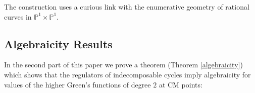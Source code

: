 \documentclass[11pt,a4paper]{article}
\newtheorem{thm}[defn]{Theorem}
\newcommand {\Q}{{\mathds Q}}
\newcommand {\M}{{\mathcal M}}
\newcommand {\CP}{{\mathds P}}
\newcommand {\lb}{{\lambda}}
\newcommand {\KE}{{K_{E_1 \times E_2}}}
\newcommand {\TKE}{{{\tilde K}_{E_1\times E_2}}}
\newcommand {\CPP}{\CP^1 \times \CP^1}
\def\skipchunk#1{}
\begin{document}
\skipchunk{\begin{thm} Let $E_1=E_{\lambda_1}$ and $E_2=E_{\lambda_2}$ be two elliptic curves with full level two structure and let $\KE$ and $\TKE$ be the Kummer surface and Kummer $K3$ surface associated to $E_1 \times E_2$ as in Section \ref{sssec-km-surface-prod-ell-curves}. 
%
Let  $\phi:E_1 \rightarrow E_2$ is an isogeny of degree $n$ with $n$ and let $T_n^{\gamma}$ be a component of  the $n^{th}$ Hecke correspondence parametrizing those pairs $(E_1,E_2)$ where such a $\phi$ exists. Then 
%
\begin{itemize}
	\item There is a family of  irreducible nodal curves $C_{n,1}=C_{n,1,\lambda_1,\lambda_2}^{\phi,\gamma}$ on $\KE$ with nodes at $2n+1$ specified points on $\KE$ defined as long as $\lb_1,\lb_2$ {\bf do not} lie on $T_n^{\gamma}$.  
	\item   For every node $c=c_{\lb_1,\lb_2}$ of $\KE$ lying on $C_{n,1}$ there exists an   motivic cycle 
%
$$\xi^{\phi,\gamma}_{n,c}=\xi_{n,c} \in H^3_{\M}(\TKE,\Q(2))$$   
%
and this determines a family of cycles parametrized by $\lb_1,\lb_2$ and defined as long as $\lb_1,\lb_2$ does not lie on $T_n^{\gamma}$ 
\item This family of cycles is generically  indecomposable in the sense of Section \ref{indecomp}. 
\end{itemize}
\end{thm}}


The construction uses a curious link with the enumerative geometry of rational curves in $\CPP$.  



\subsection{Algebraicity Results}

In the second part of this paper  we prove a theorem (Theorem \ref{algebraicity}) which  shows that the regulators of indecomposable cycles imply algebraicity for values of the higher Green's functions of degree $2$ at CM points:
\end{document}
